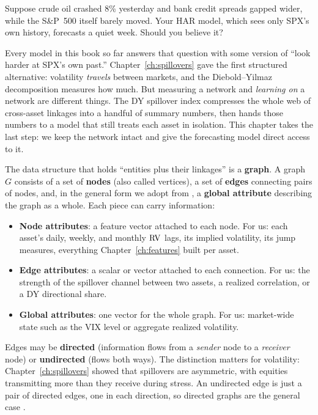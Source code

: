 Suppose crude oil crashed 8\% yesterday and bank credit spreads gapped wider, while the S\&P~500 itself barely moved. Your HAR model, which sees only SPX's own history, forecasts a quiet week. Should you believe it?

Every model in this book so far answers that question with some version of ``look harder at SPX's own past.'' Chapter~\ref{ch:spillovers} gave the first structured alternative: volatility \emph{travels} between markets, and the Diebold--Yilmaz decomposition measures how much. But measuring a network and \emph{learning on} a network are different things. The DY spillover index compresses the whole web of cross-asset linkages into a handful of summary numbers, then hands those numbers to a model that still treats each asset in isolation. This chapter takes the last step: we keep the network intact and give the forecasting model direct access to it.

The data structure that holds ``entities plus their linkages'' is a \textbf{graph}. A graph $G$ consists of a set of \textbf{nodes} (also called vertices), a set of \textbf{edges} connecting pairs of nodes, and, in the general form we adopt from \citet{Battaglia2018}, a \textbf{global attribute} describing the graph as a whole. Each piece can carry information:

\begin{itemize}[nosep]
  \item \textbf{Node attributes}: a feature vector attached to each node. For us: each asset's daily, weekly, and monthly $\operatorname{RV}$ lags, its implied volatility, its jump measures, everything Chapter~\ref{ch:features} built per asset.
  \item \textbf{Edge attributes}: a scalar or vector attached to each connection. For us: the strength of the spillover channel between two assets, a realized correlation, or a DY directional share.
  \item \textbf{Global attributes}: one vector for the whole graph. For us: market-wide state such as the VIX level or aggregate realized volatility.
\end{itemize}

Edges may be \textbf{directed} (information flows from a \emph{sender} node to a \emph{receiver} node) or \textbf{undirected} (flows both ways). The distinction matters for volatility: Chapter~\ref{ch:spillovers} showed that spillovers are asymmetric, with equities transmitting more than they receive during stress. An undirected edge is just a pair of directed edges, one in each direction, so directed graphs are the general case \citep{SanchezLengeling2021}.

